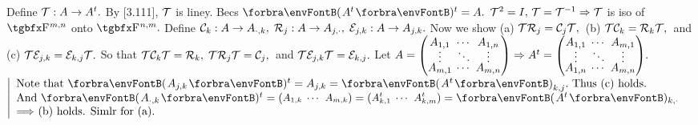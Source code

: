 \def\fT{\mT}\def\fC{\mC}\def\fR{\mR}\def\fP{\mE}

\BulletPointX{}\;\;Define $\fT:A\rightarrow A^t.$ By [3.111], $\fT$ is liney. Becs $\Par{A^t}{^t}=A.$ \TextB{}
$\fT^2=I,\,\fT=\fT^{-1}\Rightarrow \fT$ is iso of $\FbbP{m,n}$ onto $\FbbP{n,m}.$ \;Define $\fC_k:A\rightarrow A_{\cdot,k},\;\fR_j:A\rightarrow A_{j,\cdot},\;\fP_{j,k}:A\rightarrow A_{j,k}.$\TextB{}
Now we show (a) \uline{$\fT\fR_j=\fC_j\fT,$} \,(b) \uline{$\fT\fC_k=\fR_k\fT,$} \,and (c) \uline{$\fT\fP_{j,k}=\fP_{k,j}\fT.$}\TextB{\vspace{2pt}}
So that $\fT\fC_k\fT=\fR_k,\;\fT\fR_j\fT=\fC_j,$ \,and $\fT\fP_{j,k}\fT=\fP_{k,j}.$\TextB{\vspace{2pt}}
Let $A={}{\normalsize\begin{pmatrix}A_{1,1} &\hspace{-6pt} \cdots &\hspace{-6pt} A_{1,n}\\[-4pt] \vdots &\hspace{-6pt} \ddots &\hspace{-6pt} \vdots\\[-4pt] A_{m,1} &\hspace{-6pt} \cdots &\hspace{-6pt} A_{m,n}\end{pmatrix}}\Rightarrow A^t={}{\normalsize\begin{pmatrix}A_{1,1} &\hspace{-6pt} \cdots &\hspace{-6pt} A_{m,1}\\[-4pt] \vdots &\hspace{-6pt} \ddots &\hspace{-6pt} \vdots\\[-4pt] A_{1,n} &\hspace{-6pt} \cdots &\hspace{-6pt} A_{m,n}\end{pmatrix}}.$ \;$\MathLeftMid{l}{\!\!$
Note that $\Par{A_{j,k}}{^t}=A_{j,k}=\Par{A^t}_{k,j}.$ Thus (c) holds.$\\$
\!\!And $\Par{A_{\cdot,k}}{^t}={}{\small\begin{pmatrix}A_{1,k} &\hspace{-6pt} \cdots &\hspace{-6pt}A_{m,k}\end{pmatrix}}{}={}{\small\begin{pmatrix}A^t_{k,1} &\hspace{-6pt} \cdots &\hspace{-6pt}A^t_{k,m}\end{pmatrix}}{}=\Par{A^t}{_{k,\cdot}}\\$
\!\!$\Longrightarrow$ (b) holds. Simlr for (a).$}$\par\vspace{10pt}
\SepLine

